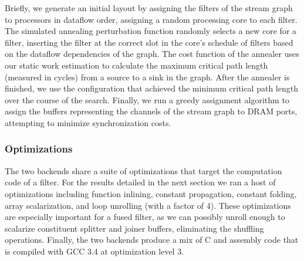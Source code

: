 Briefly, we generate an initial layout by assigning the filters of the
stream graph to processors in dataflow order, assigning a random
processing core to each filter. The simulated annealing perturbation
function randomly selects a new core for a filter, inserting the
filter at the correct slot in the core's schedule of filters based on
the dataflow dependencies of the graph.  The cost function of the
annealer uses our static work estimation to calculate the maximum
critical path length (measured in cycles) from a source to a sink in
the graph.  After the annealer is finished, we use the configuration
that achieved the minimum critical path length over the course of the
search.  Finally, we run a greedy assignment algorithm to assign the
buffers representing the channels of the stream graph to DRAM ports,
attempting to minimize synchronization costs.

\subsubsection{Optimizations}

The two backends share a suite of optimizations that target the
computation code of a filter.  For the results detailed in the next
section we ran a host of optimizations including function inlining,
constant propagation, constant folding, array scalarization, and loop
unrolling (with a factor of 4).  These optimizations are especially
important for a fused filter, as we can possibly unroll enough to
scalarize constituent splitter and joiner buffers, eliminating the
shuffling operations.  Finally, the two backends produce a mix of C
and assembly code that is compiled with GCC 3.4 at optimization level
3.
